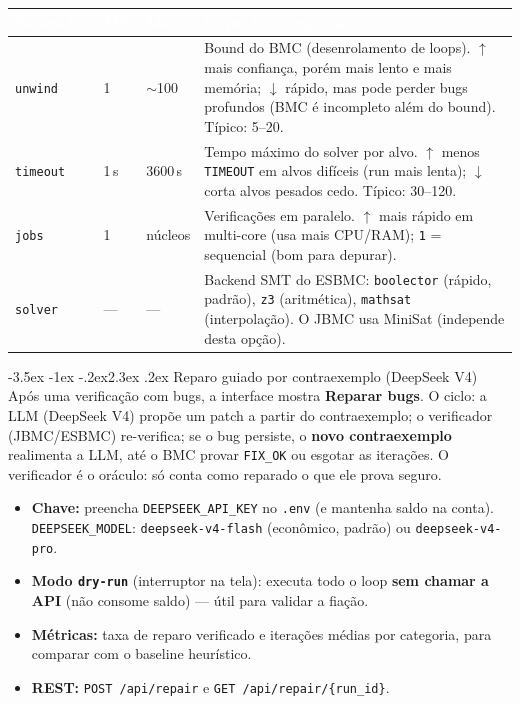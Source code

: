 \documentclass[11pt,a4paper]{article}
\makeatletter
\renewcommand\section{\@startsection{section}{1}{0pt}%
  {-3.5ex \@plus -1ex \@minus -.2ex}{2.3ex \@plus.2ex}%
  {\normalfont\Large\bfseries\color{azulesc}}}
\newcommand{\hc}[1]{\textcolor{white}{\textbf{#1}}}
\makeatother
\begin{document}
\begin{center}
\footnotesize
\begin{longtable}{|L{2.3cm}|L{1.3cm}|L{1.9cm}|L{8cm}|}
\hline
{} \hc{Par\^ametro} & \hc{M\'in} & \hc{M\'ax} & \hc{O que faz / implica\c{c}\~ao} \\ \hline
\endhead
\texttt{unwind} & 1 & $\sim$100 & Bound do BMC (desenrolamento de loops). $\uparrow$ mais confian\c{c}a, por\'em mais lento e mais mem\'oria; $\downarrow$ r\'apido, mas pode perder bugs profundos (BMC \'e incompleto al\'em do bound). T\'ipico: 5--20. \\ \hline
\texttt{timeout} & 1\,s & 3600\,s & Tempo m\'aximo do solver por alvo. $\uparrow$ menos \texttt{TIMEOUT} em alvos dif\'iceis (run mais lenta); $\downarrow$ corta alvos pesados cedo. T\'ipico: 30--120. \\ \hline
\texttt{jobs} & 1 & n\'ucleos & Verifica\c{c}\~oes em paralelo. $\uparrow$ mais r\'apido em multi-core (usa mais CPU/RAM); \texttt{1} = sequencial (bom para depurar). \\ \hline
\texttt{solver} & --- & --- & Backend SMT do ESBMC: \texttt{boolector} (r\'apido, padr\~ao), \texttt{z3} (aritm\'etica), \texttt{mathsat} (interpola\c{c}\~ao). O JBMC usa MiniSat (independe desta op\c{c}\~ao). \\ \hline
\end{longtable}
\end{center}

\section{Reparo guiado por contraexemplo (DeepSeek V4)}
Ap\'os uma verifica\c{c}\~ao com bugs, a interface mostra \textbf{Reparar bugs}. O ciclo:
a LLM (DeepSeek V4) prop\~oe um patch a partir do contraexemplo; o verificador
(JBMC/ESBMC) re-verifica; se o bug persiste, o \textbf{novo contraexemplo} realimenta
a LLM, at\'e o BMC provar \texttt{FIX\_OK} ou esgotar as itera\c{c}\~oes. O verificador
\'e o or\'aculo: s\'o conta como reparado o que ele prova seguro.

\begin{itemize}
  \item \textbf{Chave:} preencha \texttt{DEEPSEEK\_API\_KEY} no \texttt{.env} (e mantenha
        saldo na conta). \texttt{DEEPSEEK\_MODEL}: \texttt{deepseek-v4-flash} (econ\^omico,
        padr\~ao) ou \texttt{deepseek-v4-pro}.
  \item \textbf{Modo \texttt{dry-run}} (interruptor na tela): executa todo o loop
        \textbf{sem chamar a API} (n\~ao consome saldo) --- \'util para validar a fia\c{c}\~ao.
  \item \textbf{M\'etricas:} taxa de reparo verificado e itera\c{c}\~oes m\'edias por
        categoria, para comparar com o baseline heur\'istico.
  \item \textbf{REST:} \texttt{POST /api/repair} e \texttt{GET /api/repair/\{run\_id\}}.
\end{itemize}
\end{document}
